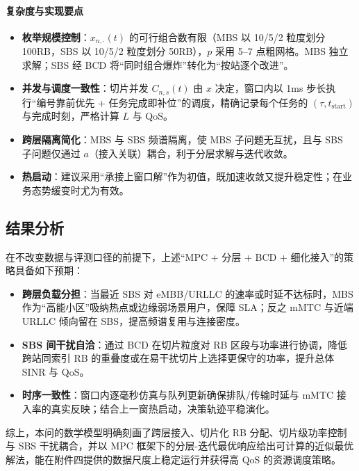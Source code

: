 \paragraph{复杂度与实现要点}
\begin{itemize}
  \item \textbf{枚举规模控制}：$x_{n,\cdot}(t)$ 的可行组合数有限（MBS 以 10/5/2 粒度划分 100RB，SBS 以 10/5/2 粒度划分 50RB），$p$ 采用 5--7 点粗网格。MBS 独立求解；SBS 经 BCD 将“同时组合爆炸”转化为“按站逐个改进”。
  \item \textbf{并发与调度一致性}：切片并发 $C_{n,s}(t)$ 由 $x$ 决定，窗口内以 1ms 步长执行“编号靠前优先 + 任务完成即补位”的调度，精确记录每个任务的 $(\tau, t_{\text{start}})$ 与完成时刻，严格计算 $L$ 与 QoS。
  \item \textbf{跨层隔离简化}：MBS 与 SBS 频谱隔离，使 MBS 子问题无互扰，且与 SBS 子问题仅通过 $a$（接入关联）耦合，利于分层求解与迭代收敛。
  \item \textbf{热启动}：建议采用“承接上窗口解”作为初值，既加速收敛又提升稳定性；在业务态势缓变时尤为有效。
\end{itemize}

\subsection{结果分析}

在不改变数据与评测口径的前提下，上述“MPC + 分层 + BCD + 细化接入”的策略具备如下预期：
\begin{itemize}
  \item \textbf{跨层负载分担}：当最近 SBS 对 eMBB/URLLC 的速率或时延不达标时，MBS 作为“高能小区”吸纳热点或边缘弱场景用户，保障 SLA；反之 mMTC 与近端 URLLC 倾向留在 SBS，提高频谱复用与连接密度。
  \item \textbf{SBS 间干扰自洽}：通过 BCD 在切片粒度对 RB 区段与功率进行协调，降低跨站同索引 RB 的重叠度或在易干扰切片上选择更保守的功率，提升总体 SINR 与 QoS。
  \item \textbf{时序一致性}：窗口内逐毫秒仿真与队列更新确保排队/传输时延与 mMTC 接入率的真实反映；结合上一窗热启动，决策轨迹平稳演化。
\end{itemize}

综上，本问的数学模型明确刻画了跨层接入、切片化 RB 分配、切片级功率控制与 SBS 干扰耦合，并以 MPC 框架下的分层-迭代最优响应给出可计算的近似最优解法，能在附件四提供的数据尺度上稳定运行并获得高 QoS 的资源调度策略。
